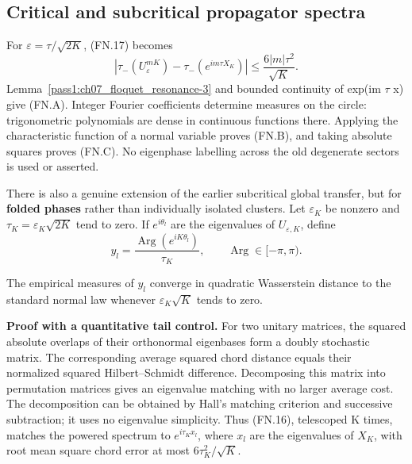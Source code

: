 \subsection{Critical and subcritical propagator spectra}\label{floquet:critical-and-subcritical-propagator-spectra}

For \(\varepsilon=\tau/\sqrt{2K}\), (FN.17) becomes \[
 \left|\tau_-(U_\varepsilon^{mK})-
              \tau_-(e^{im\tau X_K})\right|
       \leq \frac{6|m|\tau^2}{\sqrt K}.                        \tag{FN.21}
\] Lemma~\ref{pass1:ch07_floquet_resonance-3} and bounded continuity of exp(im \(\tau\) x) give (FN.A). Integer Fourier coefficients determine measures on the circle: trigonometric polynomials are dense in continuous functions there. Applying the characteristic function of a normal variable proves (FN.B), and taking absolute squares proves (FN.C). No eigenphase labelling across the old degenerate sectors is used or asserted.

There is also a genuine extension of the earlier subcritical global transfer, but for \textbf{folded phases} rather than individually isolated clusters. Let \(\varepsilon_{K}\) be nonzero and \(\tau_K=\varepsilon_K\sqrt{2K}\) tend to zero. If \(e^{i\theta_l}\) are the eigenvalues of \(U_{\varepsilon,K}\), define \[
 y_l=\frac{\operatorname{Arg}(e^{iK\theta_l})}{\tau_K},
 \qquad \operatorname{Arg}\in[-\pi,\pi).
\]

\begin{corollary}\label{pass1:ch07_floquet_resonance-4} The empirical measures of \(y_{l}\) converge in quadratic Wasserstein distance to the standard normal law whenever \(\varepsilon_K\sqrt K\) tends to zero.
\end{corollary}

\textbf{Proof with a quantitative tail control.} For two unitary matrices, the squared absolute overlaps of their orthonormal eigenbases form a doubly stochastic matrix. The corresponding average squared chord distance equals their normalized squared Hilbert--Schmidt difference. Decomposing this matrix into permutation matrices gives an eigenvalue matching with no larger average cost. The decomposition can be obtained by Hall's matching criterion and successive subtraction; it uses no eigenvalue simplicity. Thus (FN.16), telescoped K times, matches the powered spectrum to \(e^{i\tau_Kx_l}\), where \(x_{l}\) are the eigenvalues of \(X_{K}\), with root mean square chord error at most \(6\tau_K^2/\sqrt K\).

